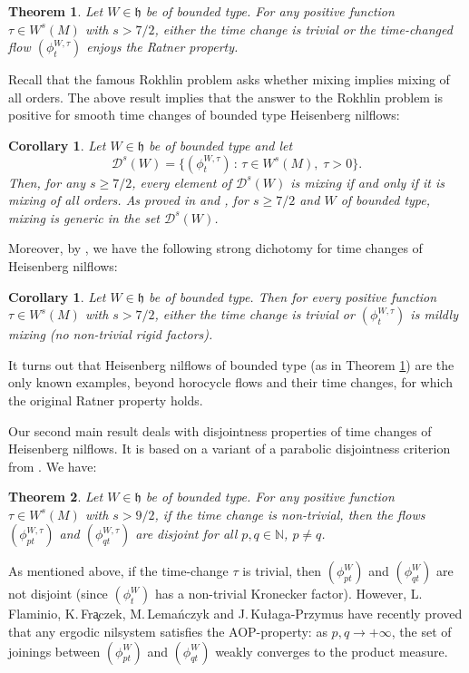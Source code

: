 \documentclass[JEP,XML,SOM,Unicode,NoEqCountersInSection]{cedram}
\let\mathcal\mathscr
\newcommand{\sep}{\,:\,}
\theoremstyle{definition}
\theoremstyle{plain}
\newtheorem{theorem}{Theorem}
\newtheorem{corollary}[definition]{Corollary}
\newcommand\NN{\mathbb{N}}
\newcommand{\cD}{\mathcal D}
\begin{document}
\begin{theorem}\label{main:thm'} Let $W\in \mathfrak h$ be of bounded type. For any positive function $\tau\in W^s(M)$ with $s>7/2$, either the time change is trivial or the time-changed flow $(\phi_t^{W,\tau})$ enjoys the Ratner property.
\end{theorem}

Recall that the famous Rokhlin problem asks whether mixing implies mixing of all orders.
The above result implies that the answer to the Rokhlin problem is positive for smooth time changes of bounded type Heisenberg nilflows:
\begin{corollary} Let $W\in \mathfrak h$ be of bounded type and let
\[
\cD^s(W)=\{(\phi_t^{W,\tau})\sep \tau\in W^s(M),\; \tau>0\}.
\]
Then, for any $s\geq 7/2$, every element of $\cD^s(W)$ is mixing if and only if it is mixing of all orders.
As proved in \cite{AFU} and \cite{FK}, for $s\geq 7/2$ and $W$ of bounded type, mixing is generic in the set $\cD^s(W)$.
\end{corollary}

Moreover, by \cite{KL}, we have the following strong dichotomy for time changes of Heisenberg nilflows:
\begin{corollary}\label{corA} Let $W\in \mathfrak h$ be of bounded type. Then for every positive function $\tau\in W^s(M)$ with $s>7/2$, either
the time change is trivial or $(\phi_t^{W,\tau})$ is mildly mixing (no non-trivial rigid factors).
\end{corollary}

It turns out that Heisenberg nilflows of bounded type (as in Theorem \ref{main:thm'}) are the only known examples, beyond horocycle flows and their time changes, for which the original Ratner property holds.

Our second main result deals with disjointness properties of time changes of Heisenberg nilflows. It is based on a variant of a parabolic disjointness criterion from \cite{KLU}. We have:

\begin{theorem}\label{thm:main2'} Let $W\in \mathfrak h$ be of bounded type. For any positive function $\tau\in W^s(M)$ with $s>9/2$, if the time change is non-trivial, then the flows $(\phi_{pt}^{W,\tau})$ and $(\phi_{qt}^{W,\tau})$ are disjoint for
all $p,q\in \NN$, $p\neq q$.
\end{theorem}

As mentioned above, if the time-change $\tau$
is trivial, then $(\phi_{pt}^{W})$ and $(\phi_{qt}^{W})$ are not disjoint (since $(\phi_t^W)$ has a non-trivial Kronecker factor). However, L.\,Flaminio, K.\,Fr\c aczek, M.\,Lema{\'n}czyk and J.\,Ku{\l}aga-Przymus \cite{FFKL} have recently proved that any ergodic nilsystem satisfies the AOP-property: as $p,q\to +\infty$, the set of joinings between $(\phi_{pt}^{W})$ and $(\phi_{qt}^{W})$ weakly converges to the product measure.
\end{document}
